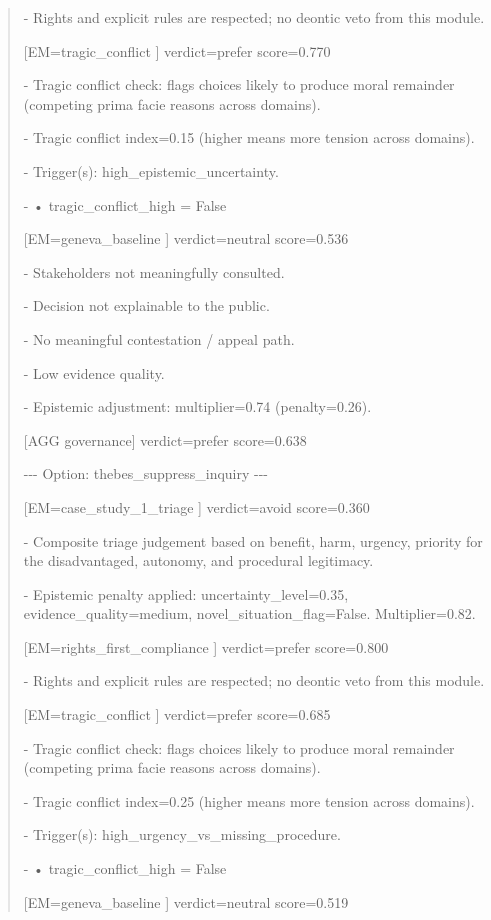 \documentclass[12pt]{article}
\theoremstyle{plain}
\theoremstyle{definition}
\theoremstyle{remark}
\begin{document}
\begin{quote}
- Rights and explicit rules are respected; no deontic veto from this
module.

{[}EM=tragic\_conflict {]} verdict=prefer score=0.770

- Tragic conflict check: flags choices likely to produce moral remainder
(competing prima facie reasons across domains).

- Tragic conflict index=0.15 (higher means more tension across domains).

- Trigger(s): high\_epistemic\_uncertainty.

- • tragic\_conflict\_high = False

{[}EM=geneva\_baseline {]} verdict=neutral score=0.536

- Stakeholders not meaningfully consulted.

- Decision not explainable to the public.

- No meaningful contestation / appeal path.

- Low evidence quality.

- Epistemic adjustment: multiplier=0.74 (penalty=0.26).

{[}AGG governance{]} verdict=prefer score=0.638

-\/-\/- Option: thebes\_suppress\_inquiry -\/-\/-

{[}EM=case\_study\_1\_triage {]} verdict=avoid score=0.360

- Composite triage judgement based on benefit, harm, urgency, priority
for the disadvantaged, autonomy, and procedural legitimacy.

- Epistemic penalty applied: uncertainty\_level=0.35,
evidence\_quality=medium, novel\_situation\_flag=False. Multiplier=0.82.

{[}EM=rights\_first\_compliance {]} verdict=prefer score=0.800

- Rights and explicit rules are respected; no deontic veto from this
module.

{[}EM=tragic\_conflict {]} verdict=prefer score=0.685

- Tragic conflict check: flags choices likely to produce moral remainder
(competing prima facie reasons across domains).

- Tragic conflict index=0.25 (higher means more tension across domains).

- Trigger(s): high\_urgency\_vs\_missing\_procedure.

- • tragic\_conflict\_high = False

{[}EM=geneva\_baseline {]} verdict=neutral score=0.519


\end{quote}
\end{document}
